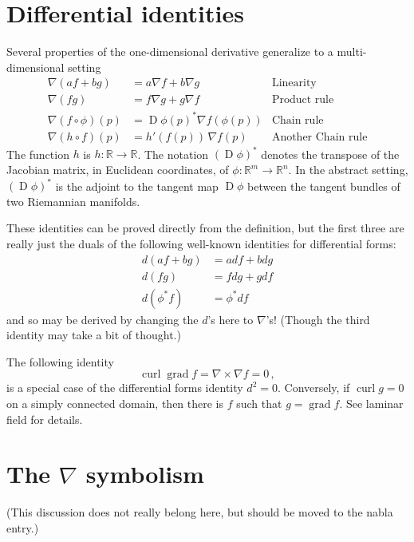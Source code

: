 \documentclass{article}
\newcommand{\real}{\mathbb{R}}
\DeclareMathOperator{\D}{D}
\newcommand{\grad}{\operatorname{grad}}
\newcommand{\curl}{\operatorname{curl}}
\begin{document}
\section{Differential identities}
Several properties of the one-dimensional derivative generalize to a
multi-dimensional setting
\begin{align*}
\nabla(af+bg) &= a\nabla f + b\nabla g & \text{Linearity}\\
\nabla(fg) &= f\nabla g + g\nabla f & \text{Product rule}\\
\nabla( f \circ \phi ) (p) &= \D \phi(p)^* \nabla f(\phi(p)) & \text{Chain rule} \\
\nabla(h \circ f)(p) &= h'(f(p)) \, \nabla f(p) & \text{Another Chain rule} 
\end{align*}
The function $h$ is $h\colon \real \to \real$.
The notation $(\D \phi)^*$ denotes the transpose of the Jacobian matrix,
in Euclidean coordinates, of $\phi \colon \real^m \to \real^n$.
In the abstract setting, $(\D \phi)^*$ is the adjoint to the tangent map $\D \phi$
between the tangent bundles of two Riemannian manifolds.  


These identities can be proved directly from the definition,
but the first three are really just the duals
of the following well-known identities for differential forms:
\begin{align*}
d(af + bg) &= a df + b dg \\
d(fg) &= f dg + g df \\
d(\phi^* f) &= \phi^* df
\end{align*}
and so may be derived by changing the $d$'s here
to $\nabla$'s!  (Though the third identity may take a bit of thought.)

\smallskip

The following identity
\[
\curl \grad f = \nabla \times \nabla f = 0\,,
\]
is a special case of the differential forms identity $d^2 = 0$.
Conversely, if $\curl g = 0$ on a simply connected domain, then there
is $f$ such that $g = \grad f$.  See laminar field for details.


\section{The $\nabla$ symbolism}
(This discussion does not really belong here, but should be moved
to the nabla entry.)
\end{document}
